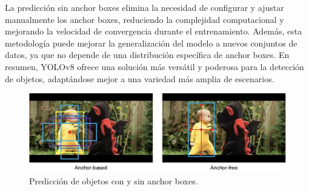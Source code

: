 La predicción sin anchor boxes elimina la necesidad de configurar y ajustar manualmente los anchor boxes, reduciendo la complejidad computacional y mejorando la velocidad de convergencia durante el entrenamiento. Además, esta metodología puede mejorar la generalización del modelo a nuevos conjuntos de datos, ya que no depende de una distribución específica de anchor boxes. En resumen, YOLOv8 ofrece una solución más versátil y poderosa para la detección de objetos, adaptándose mejor a una variedad más amplia de escenarios.

\begin{figure}[H]
    \centering
    \includegraphics[width=1\textwidth]{../img/anchorfree-vs-anchorbox.png}
    \caption{Predicción de objetos con y sin anchor boxes.}
    \label{fig:anchor-box-free}
\end{figure}

